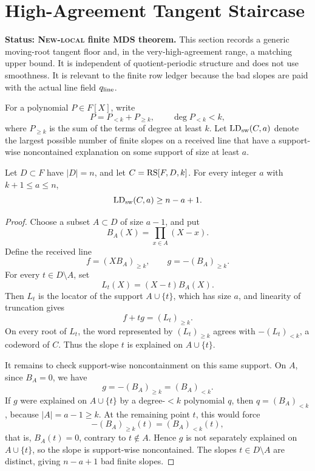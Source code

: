 
\section{High-Agreement Tangent Staircase}
\label{sec:tangent-staircase}

\textbf{Status: \textsc{New-local} finite MDS theorem.}
This section records a generic moving-root tangent floor and, in the
very-high-agreement range, a matching upper bound.  It is independent of
quotient-periodic structure and does not use smoothness.  It is relevant to the
finite row ledger because the bad slopes are paid with the actual line field
\(q_{\rm line}\).

For a polynomial \(P\in F[X]\), write
\[
  P=P_{<k}+P_{\ge k},
  \qquad \deg P_{<k}<k,
\]
where \(P_{\ge k}\) is the sum of the terms of degree at least \(k\).  Let
\(\operatorname{LD}_{\rm sw}(C,a)\) denote the largest possible number of finite
slopes on a received line that have a support-wise noncontained explanation on
some support of size at least \(a\).

\begin{theorem}
\label{thm:moving-root-tangent-floor}
Let \(D\subset F\) have \(|D|=n\), and let
\(C=\operatorname{RS}[F,D,k]\).  For every integer \(a\) with \(k+1\le a\le n\),
\[
  \operatorname{LD}_{\rm sw}(C,a)\ge n-a+1 .
\]
\end{theorem}

\begin{proof}
Choose a subset \(A\subset D\) of size \(a-1\), and put
\[
  B_A(X)=\prod_{x\in A}(X-x).
\]
Define the received line
\[
  f=(XB_A)_{\ge k},
  \qquad
  g=-(B_A)_{\ge k}.
\]
For every \(t\in D\setminus A\), set
\[
  L_t(X)=(X-t)B_A(X).
\]
Then \(L_t\) is the locator of the support \(A\cup\{t\}\), which has size
\(a\), and linearity of truncation gives
\[
  f+t g=(L_t)_{\ge k}.
\]
On every root of \(L_t\), the word represented by \((L_t)_{\ge k}\) agrees with
\(- (L_t)_{<k}\), a codeword of \(C\).  Thus the slope \(t\) is explained on
\(A\cup\{t\}\).

It remains to check support-wise noncontainment on this same support.  On
\(A\), since \(B_A=0\), we have
\[
  g=-(B_A)_{\ge k}=(B_A)_{<k}.
\]
If \(g\) were explained on \(A\cup\{t\}\) by a degree-\(<k\) polynomial \(q\),
then \(q=(B_A)_{<k}\), because \(|A|=a-1\ge k\).  At the remaining point \(t\),
this would force
\[
  -(B_A)_{\ge k}(t)=(B_A)_{<k}(t),
\]
that is, \(B_A(t)=0\), contrary to \(t\notin A\).  Hence \(g\) is not
separately explained on \(A\cup\{t\}\), so the slope is support-wise
noncontained.  The slopes \(t\in D\setminus A\) are distinct, giving
\(n-a+1\) bad finite slopes.
\end{proof}


